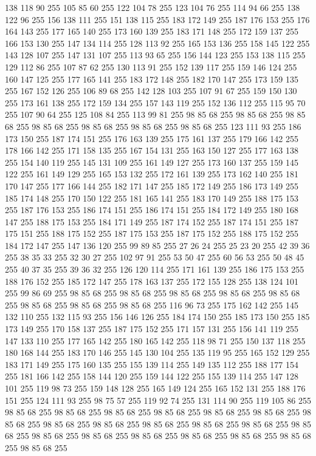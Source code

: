 138 118 90 255 105 85 60 255 122 104 78 255 123 104 76 255 114 94 66 255 138 122 96 255 156 138 111 255 151 138 115 255 183 172 149 255 187 176 153 255 176 164 143 255 177 165 140 255 173 160 139 255 183 171 148 255 172 159 137 255 166 153 130 255 147 134 114 255 128 113 92 255 165 153 136 255 158 145 122 255 143 128 107 255 147 131 107 255 113 93 65 255 156 144 123 255 153 138 115 255 129 112 86 255 107 87 62 255 130 113 91 255 152 139 117 255 159 146 124 255 160 147 125 255 177 165 141 255 183 172 148 255 182 170 147 255 173 159 135 255 167 152 126 255 106 89 68 255 142 128 103 255 107 91 67 255 159 150 130 255 173 161 138 255 172 159 134 255 157 143 119 255 152 136 112 255 115 95 70 255 107 90 64 255 125 108 84 255 113 99 81 255 98 85 68 255 98 85 68 255 98 85 68 255 98 85 68 255 98 85 68 255 98 85 68 255 98 85 68 255 123 111 93 255 186 173 150 255 187 174 151 255 176 163 139 255 175 161 137 255 179 166 142 255 178 166 142 255 171 158 135 255 167 154 131 255
163 150 127 255 177 163 138 255 154 140 119 255 145 131 109 255 161 149 127 255 173 160 137 255 159 145 122 255 161 149 129 255 165 153 132 255 172 161 139 255 173 162 140 255 181 170 147 255 177 166 144 255 182 171 147 255 185 172 149 255 186 173 149 255 185 174 148 255 170 150 122 255 181 165 141 255 183 170 149 255 188 175 153 255 187 176 153 255 186 174 151 255 186 174 151 255 184 172 149 255 180 168 147 255 188 175 153 255 184 171 149 255 187 174 152 255 187 174 151 255 187 175 151 255 188 175 152 255 187 175 153 255 187 175 152 255 188 175 152 255 184 172 147 255 147 136 120 255 99 89 85 255 27 26 24 255 25 23 20 255 42 39 36 255 38 35 33 255 32 30 27 255 102 97 91 255 53 50 47 255 60 56 53 255 50 48 45 255 40 37 35 255 39 36 32 255 126 120 114 255 171 161 139 255 186 175 153 255 188 176 152 255 185 172 147 255 178 163 137 255 172 155 128 255 138 124 101 255 99 86 69 255 98 85 68 255 98 85 68 255 98 85 68 255 98 85 68 255 98 85 68 255 98 85 68 255
98 85 68 255 98 85 68 255 116 96 73 255 175 162 142 255 145 132 110 255 132 115 93 255 156 146 126 255 184 174 150 255 185 173 150 255 185 173 149 255 170 158 137 255 187 175 152 255 171 157 131 255 156 141 119 255 147 133 110 255 177 165 142 255 180 165 142 255 118 98 71 255 150 137 118 255 180 168 144 255 183 170 146 255 145 130 104 255 135 119 95 255 165 152 129 255 183 171 149 255 175 160 135 255 155 139 114 255 149 135 112 255 188 177 154 255 181 166 142 255 158 144 120 255 159 144 122 255 155 139 114 255 147 128 101 255 119 98 73 255 159 148 128 255 165 149 124 255 165 152 131 255 188 176 151 255 124 111 93 255 98 75 57 255 119 92 74 255 131 114 90 255 119 105 86 255 98 85 68 255 98 85 68 255 98 85 68 255 98 85 68 255 98 85 68 255 98 85 68 255 98 85 68 255 98 85 68 255 98 85 68 255 98 85 68 255 98 85 68 255 98 85 68 255 98 85 68 255 98 85 68 255 98 85 68 255 98 85 68 255 98 85 68 255 98 85 68 255 98 85 68 255 98 85 68 255

